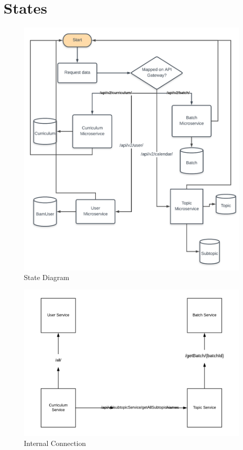 \chapter{States}
\begin{figure}[htp]
\centering
\includegraphics[width=15cm]{images/Overall}
\caption{State Diagram}
\label{fig:lion}
\end{figure}

\begin{figure}[htp]
\centering
\includegraphics[width=15cm]{images/internalDocs}
\caption{Internal Connection}
\label{fig:lion}
\end{figure}

